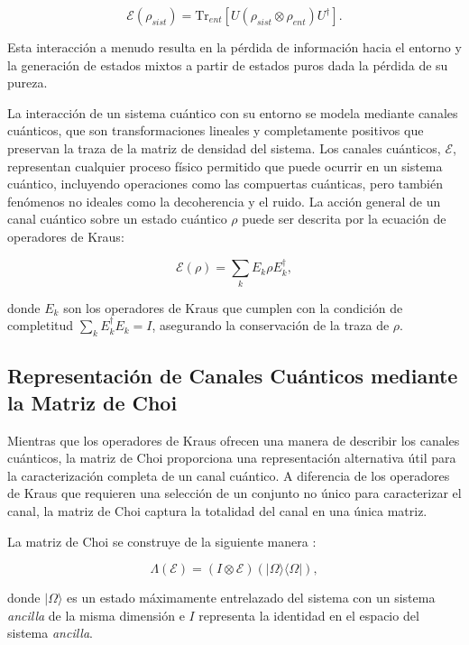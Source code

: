 \documentclass[11pt, spanish, letterpage]{report} %
\newcommand{\1}{\mathbb{1}}
\begin{document}
\begin{equation}
    \mathcal{E}(\rho_{sist}) = \text{Tr}_{ent}[ U( \rho_{sist} \otimes \rho_{ent} ) U^\dagger ].
\end{equation}

Esta interacción a menudo resulta en la pérdida de información hacia el entorno y la generación de estados mixtos a partir de estados puros dada la pérdida de su pureza. 

La interacción de un sistema cuántico con su entorno se modela mediante canales cuánticos, que son transformaciones lineales y completamente positivos que preservan la traza de la matriz de densidad del sistema. Los canales cuánticos, $\mathcal{E}$, representan cualquier proceso físico permitido que puede ocurrir en un sistema cuántico, incluyendo operaciones como las compuertas cuánticas, pero también fenómenos no ideales como la decoherencia y el ruido. La acción general de un canal cuántico sobre un estado cuántico $\rho$ puede ser descrita por la ecuación de operadores de Kraus:

\begin{equation}
\mathcal{E}(\rho) = \sum_k E_k \rho E_k^\dagger,
\end{equation}

donde $E_k$ son los operadores de Kraus que cumplen con la condición de completitud $\sum_k E_k^\dagger E_k = I$, asegurando la conservación de la traza de $\rho$.

\subsection{Representación de Canales Cuánticos mediante la Matriz de Choi}

Mientras que los operadores de Kraus ofrecen una manera de describir los canales cuánticos, la matriz de Choi proporciona una representación alternativa útil para la caracterización completa de un canal cuántico. A diferencia de los operadores de Kraus que requieren una selección de un conjunto no único para caracterizar el canal, la matriz de Choi captura la totalidad del canal en una única matriz. 

La matriz de Choi se construye de la siguiente manera \cite{QProcess}:

\begin{equation} 
\Lambda(\mathcal{E}) = (I \otimes \mathcal{E})(|\Omega\rangle\langle\Omega|),
\end{equation} 

donde $|\Omega\rangle$ es un estado máximamente entrelazado del sistema con un sistema \textit{ancilla} de la misma dimensión e $I$ representa la identidad en el espacio del sistema \textit{ancilla}.
\end{document}
